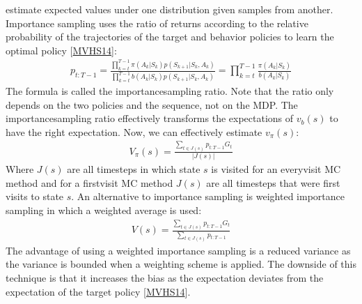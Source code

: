 \documentclass[letterpaper,10pt,english]{jupyterBook}
\begin{document}
estimate expected values under one distribution given samples from another. Importance sampling uses the ratio of returns according to the relative probability of the trajectories of the target and behavior policies to learn the optimal policy {[}\hyperlink{cite.Discussion:id62}{MVHS14}{]}:
\begin{equation*}
\begin{split} p_{t:T-1} = \frac{\prod^{T-1}_{k=t} \pi(A_k|S_k)p(S_{k+1}|S_k, A_k)}{\prod_{k=t}^{T-1}b(A_k|S_k)p(S_{k+1}|S_k,A_k)} = \prod_{k=t}^{T-1}\frac{\pi(A_k|S_k)}{b(A_k|S_k)}\end{split}
\end{equation*}
\sphinxAtStartPar
The formula is called the importance\sphinxhyphen{}sampling ratio. Note that the ratio only depends on the two policies and the sequence, not on the MDP. The importance\sphinxhyphen{}sampling ratio effectively transforms the expectations of \(v_b(s)\) to have the right expectation.  Now, we can effectively estimate \(v_{\pi}(s)\):
\begin{equation*}
\begin{split}V_{\pi}(s) = \frac{\sum_{t\in J(s)} p_{t:T-1}G_t}{|J(s)|}\end{split}
\end{equation*}
\sphinxAtStartPar
Where \(J(s)\) are all timesteps in which state \(s\) is visited for an every\sphinxhyphen{}visit MC method and for a first\sphinxhyphen{}visit MC method \(J(s)\) are all timesteps that were first visits to state \(s\). An alternative to importance sampling is weighted importance sampling in which a weighted average is used:
\begin{equation*}
\begin{split} V(s) = \frac{\sum_{t \in J(s)}p_{t:T-1}G_t}{\sum_{t \in J(s)}p_{t:T-1}} \end{split}
\end{equation*}
\sphinxAtStartPar
The advantage of using a weighted importance sampling is a reduced variance as the variance is bounded when a weighting scheme is applied. The downside of this technique is that it increases the bias as the expectation deviates from the expectation of the target policy {[}\hyperlink{cite.Discussion:id62}{MVHS14}{]}.
\end{document}
